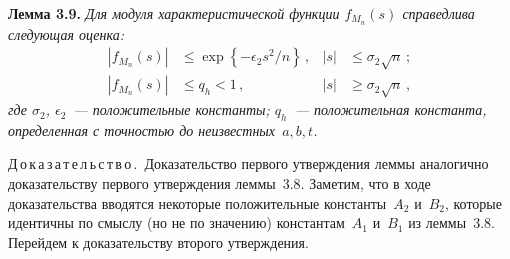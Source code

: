 \begin{multicols}{2}
\medskip

\noindent
\textbf{Лемма 3.9.}
\textit{Для модуля характеристической функции $f_{M_n}(s)$ справедлива следующая оценка:}
\begin{align*}
 |f_{M_n}(s)| &\leq \exp\left\{-{\epsilon_2 s^2}/n\right\}\,,  & |s| &\leq\sigma_2 \sqrt{n}\,; \\ 
|f_{M_n}(s)| &\leq q_h < 1\,,  & |s|&\geq\sigma_2 \sqrt{n}\,, 
\end{align*}
\textit{где $\sigma_2$, $\epsilon_2$~--- положительные константы; $q_h$~--- 
положительная константа, определенная с точностью до неизвестных~$a,b,t$.
}

\medskip

\noindent
Д\,о\,к\,а\,з\,а\,т\,е\,л\,ь\,с\,т\,в\,о\,.\  
Доказательство первого утверждения леммы аналогично
доказательству первого утверждения леммы~3.8. Заметим, что
в ходе доказательства вводятся некоторые положительные константы~$A_2$ и~$B_2$, 
которые идентичны по смыслу (но не по значению)
константам~$A_1$ и~$B_1$ из леммы~3.8. Перейдем к
доказательству второго утверждения.


\end{multicols}
